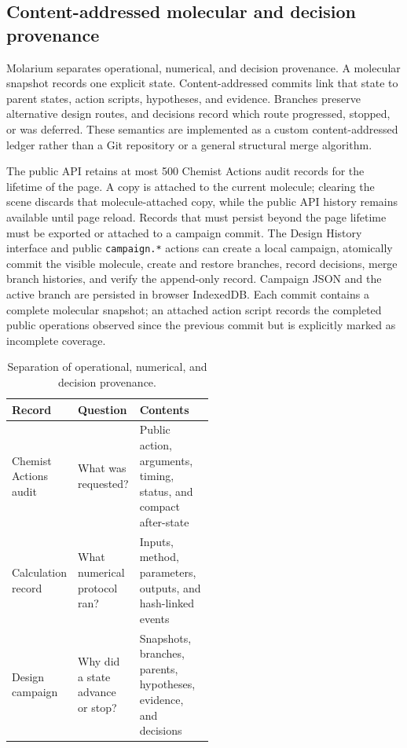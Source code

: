 \documentclass[11pt]{article}
\begin{document}
\begin{small}
\subsection{Content-addressed molecular and decision provenance}

Molarium separates operational, numerical, and decision provenance. A molecular snapshot records one explicit state. Content-addressed commits link that state to parent states, action scripts, hypotheses, and evidence. Branches preserve alternative design routes, and decisions record which route progressed, stopped, or was deferred. These semantics are implemented as a custom content-addressed ledger rather than a Git repository or a general structural merge algorithm.

The public API retains at most 500 Chemist Actions audit records for the lifetime of the page. A copy is attached to the current molecule; clearing the scene discards that molecule-attached copy, while the public API history remains available until page reload. Records that must persist beyond the page lifetime must be exported or attached to a campaign commit. The Design History interface and public \texttt{campaign.*} actions can create a local campaign, atomically commit the visible molecule, create and restore branches, record decisions, merge branch histories, and verify the append-only record. Campaign JSON and the active branch are persisted in browser IndexedDB. Each commit contains a complete molecular snapshot; an attached action script records the completed public operations observed since the previous commit but is explicitly marked as incomplete coverage.

\begin{table}[htbp]
\centering\small
\caption{Separation of operational, numerical, and decision provenance.}
\label{tab:appA_provenance}
\begin{tabularx}{\linewidth}{@{}p{0.24\linewidth}p{0.27\linewidth}X@{}}
\toprule
\textbf{Record} & \textbf{Question} & \textbf{Contents}\\
\midrule
Chemist Actions audit & What was requested? & Public action, arguments, timing, status, and compact after-state\\
Calculation record & What numerical protocol ran? & Inputs, method, parameters, outputs, and hash-linked events\\
Design campaign & Why did a state advance or stop? & Snapshots, branches, parents, hypotheses, evidence, and decisions\\
\bottomrule
\end{tabularx}
\end{table}


\end{small}
\end{document}
